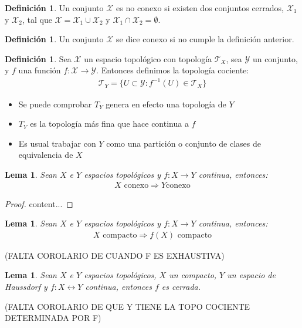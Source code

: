 \documentclass[a4paper,11pt,spanish, twoside, leqno]{tfg-uam}
\newtheorem{lema}[teor]{Lema}
\theoremstyle{definition}
\newtheorem{defin}[teor]{Definici\'on}
\begin{document}
\begin{defin}
	Un conjunto $\mathcal{X}$ es no conexo si existen dos  conjuntos cerrados, $\mathcal{X}_1$ y $\mathcal{X}_2$, tal que $\mathcal{X}=\mathcal{X}_1\cup\mathcal{X}_2$ y $\mathcal{X}_1\cap\mathcal{X}_2=\emptyset$.
\end{defin}
\begin{defin}
	Un conjunto $\mathcal{X}$ se dice conexo si no cumple la definición anterior.
\end{defin}
\begin{defin}
	Sea $\mathcal{X}$ un espacio topológico con topología $\mathcal{T}_X$, sea $\mathcal{Y}$ un conjunto, y $f$ una función  $f:\mathcal{X}\longrightarrow\mathcal{Y}$. Entonces definimos la topología cociente:
	\begin{align*}
	\mathcal{T}_Y = \{U\subset\mathcal{Y}: f^{-1}(U)\in\mathcal{T}_X\}
	\end{align*} 
	\begin{itemize}
		\item 
		Se puede comprobar $T_Y$ genera en efecto una topología de $Y$
		\item
		$T_Y$ es la topología más fina que hace continua a $f$
		\item 
		Es usual trabajar con $Y$ como una partición o conjunto de clases de equivalencia de $X$
	\end{itemize}
\end{defin}

\begin{lema}\label{conexoAconexo}
	Sean $X$ e $Y$ espacios topológicos y $f: X \longrightarrow Y$ continua, entonces: 
	\begin{align*}
	X \textrm{ conexo} \Rightarrow Y \textrm{conexo}
	\end{align*}
\end{lema}
\begin{proof}
	content...
\end{proof}


\begin{lema}\label{compactoAcompacto}
	Sean $X$ e $Y$ espacios topológicos y $f: X \longrightarrow Y$ continua, entonces: 
	\begin{align*}
	X \textrm{ compacto} \Rightarrow f(X) \textrm{ compacto}
	\end{align*}
\end{lema} (FALTA COROLARIO DE CUANDO F ES EXHAUSTIVA)

\begin{lema}\label{XcompactoYt2fcontinua}
	Sean $X$ e  $Y$ espacios topológicos, $X$ un compacto, $Y$ un espacio de Haussdorf y $f: X \longleftrightarrow Y$ continua, entonces $f$ es cerrada.
\end{lema} (FALTA COROLARIO  DE QUE Y TIENE LA TOPO COCIENTE DETERMINADA POR F)
\end{document}
